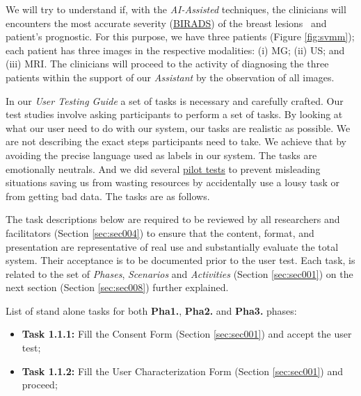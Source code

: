 \hfill


We will try to understand if, with the \textit{AI-Assisted} techniques, the clinicians will encounters the most accurate severity (\hyperlink{https://en.wikipedia.org/wiki/BI-RADS}{BIRADS}) of the breast lesions~\cite{american1998breast} and patient's prognostic. For this purpose, we have three patients (Figure \ref{fig:svmm}); each patient has three images in the respective modalities: (i) MG; (ii) US; and (iii) MRI. The clinicians will proceed to the activity of diagnosing the three patients within the support of our \textit{Assistant} by the observation of all images.

\hfill

In our \textit{User Testing Guide} a set of tasks is necessary and carefully crafted. Our test studies involve asking participants to perform a set of tasks. By looking at what our user need to do with our system, our tasks are realistic as possible. We are not describing the exact steps participants need to take. We achieve that by avoiding the precise language used as labels in our system. The tasks are emotionally neutrals. And we did several \hyperlink{https://www.nngroup.com/articles/pilot-testing/}{pilot tests} to prevent misleading situations saving us from wasting resources by accidentally use a lousy task or from getting bad data. The tasks are as follows.

The task descriptions below are required to be reviewed by all researchers and facilitators (Section \ref{sec:sec004}) to ensure that the content, format, and presentation are representative of real use and substantially evaluate the total system. Their acceptance is to be documented prior to the user test. Each task, is related to the set of {\it Phases}, {\it Scenarios} and {\it Activities} (Section \ref{sec:sec001}) on the next section (Section \ref{sec:sec008}) further explained.

\clearpage


List of stand alone tasks for both {\bf Pha1.}, {\bf Pha2.} and {\bf Pha3.} phases:


\hfill

\begin{itemize}
\item[] \textbf{Task 1.1.1:} Fill the Consent Form (Section \ref{sec:sec001}) and accept the user test;
\item[] \textbf{Task 1.1.2:} Fill the User Characterization Form (Section \ref{sec:sec001}) and proceed;
\end{itemize}

